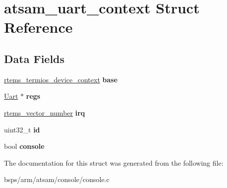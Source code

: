 \hypertarget{structatsam__uart__context}{}\section{atsam\+\_\+uart\+\_\+context Struct Reference}
\label{structatsam__uart__context}
\subsection*{Data Fields}
\begin{DoxyCompactItemize}
\item 
\mbox{\label{structatsam__uart__context_a1c77f63fa64c636d04864e14632484ac}} 
\mbox{\hyperlink{structrtems__termios__device__context}{rtems\+\_\+termios\+\_\+device\+\_\+context}} {\bfseries base}
\item 
\mbox{\label{structatsam__uart__context_a4242bea1d4797c3213a466c63650c058}} 
\mbox{\hyperlink{structUart}{Uart}} $\ast$ {\bfseries regs}
\item 
\mbox{\label{structatsam__uart__context_acd0cfe4aaf0e4099c4ebf1de9f661ef8}} 
\mbox{\hyperlink{group__ClassicINTR_ga3e434c197d99f128e78cae4d9358bd8b}{rtems\+\_\+vector\+\_\+number}} {\bfseries irq}
\item 
\mbox{\label{structatsam__uart__context_a21558382d07820b53f262835a504882f}} 
uint32\+\_\+t {\bfseries id}
\item 
\mbox{\label{structatsam__uart__context_a1b2fb1a8ad82e66bb2e702f0488cf490}} 
bool {\bfseries console}
\end{DoxyCompactItemize}


The documentation for this struct was generated from the following file\+:\begin{DoxyCompactItemize}
\item 
bsps/arm/atsam/console/console.\+c\end{DoxyCompactItemize}
